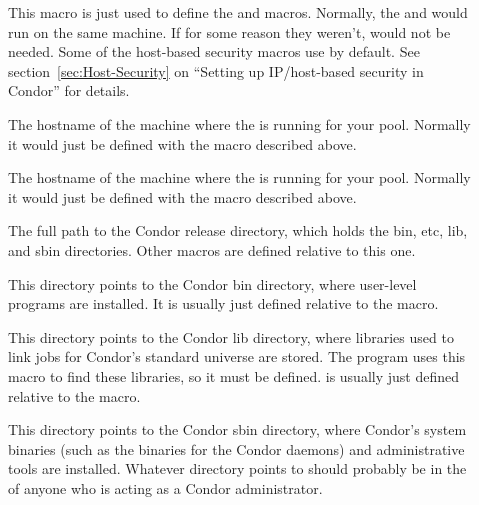 \begin{description}
  
\item[] \label{param:CondorHost} This macro is
  just used to define the  and
   macros.  Normally, the 
  and  would run on the same machine.  If for some
  reason they weren't,  would not be needed.  Some
  of the host-based security macros use  by
  default.  See section~\ref{sec:Host-Security} on ``Setting up
  IP/host-based security in Condor'' for details.
  
\item[] \label{param:CollectorHost} The
  hostname of the machine where the  is running for
  your pool.  Normally it would just be defined with the
   macro described above.

\item[] \label{param:NegotiatorHost} The
  hostname of the machine where the  is running for
  your pool.  Normally it would just be defined with the
   macro described above.

\item[] \label{param:ReleaseDir} The full path to
  the Condor release directory, which holds the bin, etc, lib, and
  sbin directories.  Other macros are defined relative to this one.

\item[] \label{param:Bin} This directory points to the
  Condor bin directory, where user-level programs are installed.  It
  is usually just defined relative to the  macro.
  
\item[] \label{param:Lib} This directory points to the
  Condor lib directory, where libraries used to link jobs for Condor's
  standard universe are stored.  The  program uses
  this macro to find these libraries, so it must be defined.
   is usually just defined relative to the
   macro.

\item[] \label{param:Sbin} This directory points to the
  Condor sbin directory, where Condor's system binaries (such as the
  binaries for the Condor daemons) and administrative tools are
  installed.  Whatever directory  points to should
  probably be in the  of anyone who is acting as a Condor
  administrator.


\end{description}
